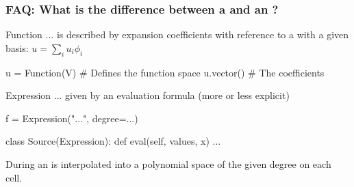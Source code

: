 \begin{frame}[fragile, shrink=5]
  \frametitle{FAQ: What is the difference between a  and an ?}

 \begin{block}{Function}
   ... is described by expansion coefficients with
   reference to a  with a given basis:
   $u = \sum_{i} u_i \phi_i$
   \vspace{-1em}
   \begin{python}
u = Function(V) # Defines the function space
u.vector()      # The coefficients
   \end{python}

 \end{block}
 \begin{block}{Expression}
   ... given by an evaluation formula (more or less explicit)
   \vspace{-1em}
   \begin{python}
f = Expression("...", degree=...)

class Source(Expression):
    def eval(self, values, x)
        ...
   \end{python}
 \end{block}

 During  an  is interpolated into a
 polynomial space of the given degree on each cell.

\end{frame}
